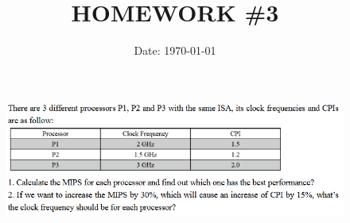 \documentclass[cn,12pt]{homework}
\title{HOMEWORK \#3} %
\date{Date: \today} %
\institute{ZHEJIANG UNIVERSITY\quad COLLEGE OF INFORMATION SCIENCE AND ELECTRONICS ENGINEERING} %
\begin{document}
\maketitle



\begin{problem}
\begin{figure}[h!]
  \centering
  \includegraphics[width=1\textwidth]{./figures/image1.png}
  \label{fig:pro1}
\end{figure}

\end{problem}
\end{document}
